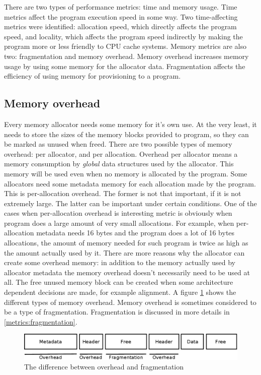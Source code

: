 There are two types of performance metrics: time and memory usage. Time metrics affect the program execution speed in some way. Two time-affecting metrics were identified: allocation speed, which directly affects the program speed, and locality, which affects the program speed indirectly by making the program more or less friendly to CPU cache systems. Memory metrics are also two: fragmentation and memory overhead. Memory overhead increases memory usage by using some memory for the allocator data. Fragmentation affects the efficiency of using memory for provisioning to a program.

\subsection{Memory overhead}
\label{metrics:overhead}
Every memory allocator needs some memory for it's own use. At the very least, it needs to store the sizes of the memory blocks provided to program, so they can be marked as unused when freed. There are two possible types of memory overhead: per allocator, and per allocation. Overhead per allocator means a memory consumption by {\em global} data structures used by the allocator. This memory will be used even when no memory is allocated by the program. Some allocators need some metadata memory for each allocation made by the program. This is per-allocation overhead. The former is not that important, if it is not extremely large. The latter can be important under certain conditions. One of the cases when per-allocation overhead is interesting metric is obviously when program does a large amount of very small allocations. For example, when per-allocation metadata needs 16 bytes and the program does a lot of 16 bytes allocations, the amount of memory needed for such program is twice as high as the amount actually used by it. There are more reasons why the allocator can create some overhead memory: in addition to the memory actually used by allocator metadata the memory overhead doesn't necessarily need to be used at all. The free unused memory block can be created when some architecture dependent decisions are made, for example alignment. A figure \ref{fig:overhead} shows the different types of memory overhead. Memory overhead is sometimes considered to be a type of fragmentation. Fragmentation is discussed in more details in \ref{metrics:fragmentation}.
\begin{figure}[h]
\begin{center}
\includegraphics[width=1.0\textwidth,keepaspectratio]{fig/frags}
\end{center}
\caption{The difference between overhead and fragmentation}
\label{fig:overhead}
\end{figure}

